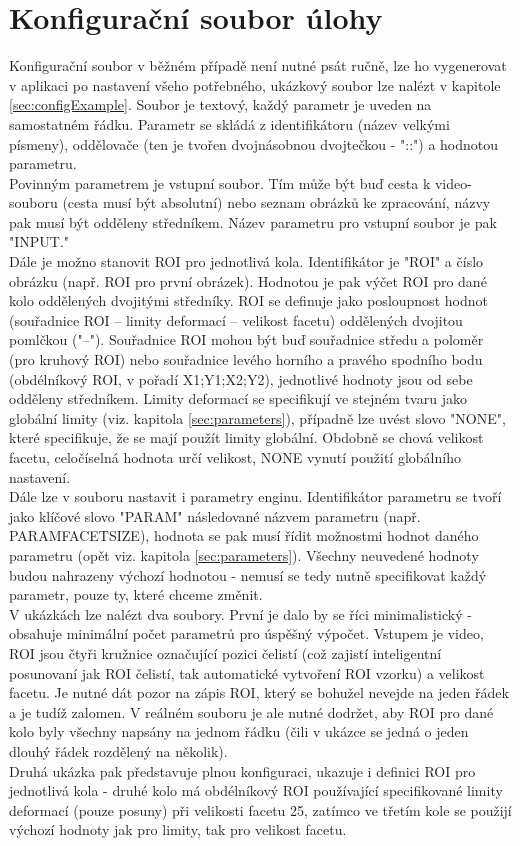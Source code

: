 \documentclass[a4paper,12pt]{article}
\begin{document}
\section{Konfigurační soubor úlohy}
\label{sec:config}
Konfigurační soubor v běžném případě není nutné psát ručně, lze ho vygenerovat v aplikaci po nastavení všeho potřebného, ukázkový soubor lze nalézt v kapitole \ref{sec:configExample}. Soubor je textový, každý parametr je uveden na samostatném řádku. Parametr se skládá z identifikátoru (název velkými písmeny), oddělovače (ten je tvořen dvojnásobnou dvojtečkou - "::") a hodnotou parametru.\\
Povinným parametrem je vstupní soubor. Tím může být buď cesta k video-souboru (cesta musí být absolutní) nebo seznam obrázků ke zpracování, názvy pak musí být odděleny středníkem. Název parametru pro vstupní soubor je pak "INPUT."\\
Dále je možno stanovit ROI pro jednotlivá kola. Identifikátor je "ROI\textunderscore " a číslo obrázku (např. ROI pro první obrázek). Hodnotou je pak výčet ROI pro dané kolo oddělených dvojitými středníky. ROI se definuje jako posloupnost hodnot (souřadnice ROI -- limity deformací -- velikost facetu) oddělených dvojitou pomlčkou ("--"). Souřadnice ROI mohou být buď souřadnice středu a poloměr (pro kruhový ROI) nebo souřadnice levého horního a pravého spodního bodu (obdélníkový ROI, v pořadí X1;Y1;X2;Y2), jednotlivé hodnoty jsou od sebe odděleny středníkem. Limity deformací se specifikují ve stejném tvaru jako globální limity (viz. kapitola \ref{sec:parameters}), případně lze uvést slovo "NONE", které specifikuje, že se mají použít limity globální. Obdobně se chová velikost facetu, celočíselná hodnota určí velikost, NONE vynutí použití globálního nastavení.\\
Dále lze v souboru nastavit i parametry enginu. Identifikátor parametru se tvoří jako klíčové slovo "PARAM\textunderscore" následované názvem parametru (např. PARAM\textunderscore FACET\textunderscore SIZE), hodnota se pak musí řídit možnostmi hodnot daného parametru (opět viz. kapitola \ref{sec:parameters}). Všechny neuvedené hodnoty budou nahrazeny výchozí hodnotou - nemusí se tedy nutně specifikovat každý parametr, pouze ty, které chceme změnit.\\
V ukázkách lze nalézt dva soubory. První je dalo by se říci minimalistický - obsahuje minimální počet parametrů pro úspěšný výpočet. Vstupem je video, ROI jsou čtyři kružnice označující pozici čelistí (což zajistí inteligentní posunovaní jak ROI čelistí, tak automatické vytvoření ROI vzorku) a velikost facetu. Je nutné dát pozor na zápis ROI, který se bohužel nevejde na jeden řádek a je tudíž zalomen. V reálném souboru je ale nutné dodržet, aby ROI pro dané kolo byly všechny napsány na jednom řádku (čili v ukázce se jedná o jeden dlouhý řádek rozdělený na několik).\\
Druhá ukázka pak představuje plnou konfiguraci, ukazuje i definici ROI pro jednotlivá kola - druhé kolo má obdélníkový ROI používající specifikované limity deformací (pouze posuny) při velikosti facetu 25, zatímco ve třetím kole se použijí výchozí hodnoty jak pro limity, tak pro velikost facetu.
\newpage
\end{document}
